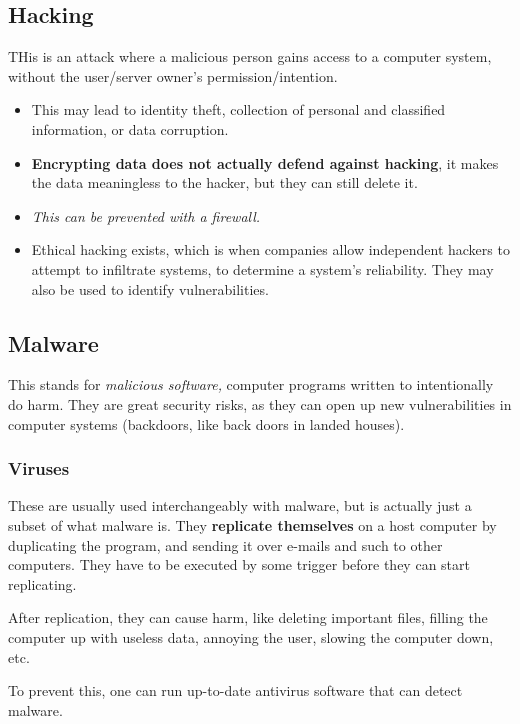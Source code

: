 \documentclass[../main.tex]{subfiles}
\begin{document}
\subsection{Hacking}

THis is an attack where a malicious person gains access to a computer system, without the user/server owner's permission/intention.
\begin{itemize}
    \item This may lead to identity theft, collection of personal and classified information, or data corruption. 
    \item \textbf{Encrypting data does not actually defend against hacking}, it makes the data meaningless to the hacker, but they can still delete it.
    \item \emph{This can be prevented with a firewall.}
    \item Ethical hacking exists, which is when companies allow independent hackers to attempt to infiltrate systems, to determine a system's reliability. They may also be used to identify vulnerabilities.
\end{itemize}

\subsection{Malware}

This stands for \emph{malicious software,} computer programs written to intentionally do harm. They are great security risks, as they can open up new vulnerabilities in computer systems (backdoors, like back doors in landed houses).

\subsubsection{Viruses}

These are usually used interchangeably with malware, but is actually just a subset of what malware is. They \textbf{replicate themselves} on a host computer by duplicating the program, and sending it over e-mails and such to other computers. They have to be executed by some trigger before they can start replicating.

After replication, they can cause harm, like deleting important files, filling the computer up with useless data, annoying the user, slowing the computer down, etc.

To prevent this, one can run up-to-date antivirus software that can detect malware.
\end{document}
